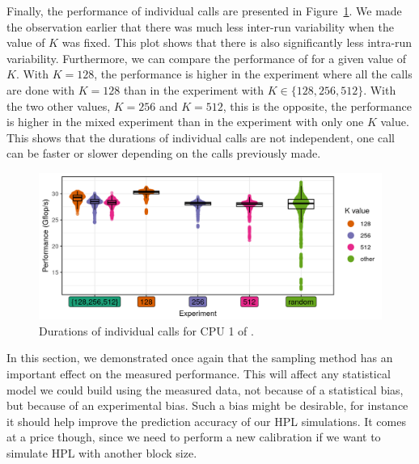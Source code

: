             Finally, the performance of individual \dgemm calls are presented in
            Figure~\ref{fig:randomizing_sizes:expfile:fixing_K:raw_data}. We made the observation earlier that there was
            much less inter-run variability when the value of \(K\) was fixed. This plot shows that there is also
            significantly less intra-run variability. Furthermore, we can compare the performance of \dgemm for a given
            value of \(K\). With \(K=128\), the performance is higher in the experiment where all the calls are done
            with \(K=128\) than in the experiment with \(K\in\{128,256,512\}\). With the two other values, \(K=256\) and
            \(K=512\), this is the opposite, the performance is higher in the mixed experiment than in the experiment
            with only one \(K\) value. This shows that the durations of individual \dgemm calls are not independent, one
            call can be faster or slower depending on the calls previously made.
            \begin{figure}[htpb]
                \centering
                \includegraphics[width=1\linewidth]{img/experiment/randomizing_sizes/fixing_K/raw_data.png}
                \caption{Durations of individual \dgemm calls for CPU 1 of \dahu[5].}%
                \label{fig:randomizing_sizes:expfile:fixing_K:raw_data}
            \end{figure}

            In this section, we demonstrated once again that the sampling method has an important effect on the measured
            performance. This will affect any statistical model we could build using the measured data, not because of a
            statistical bias, but because of an experimental bias. Such a bias might be desirable, for instance it
            should help improve the prediction accuracy of our HPL simulations. It comes at a price though, since we
            need to perform a new \dgemm calibration if we want to simulate HPL with another block size.

